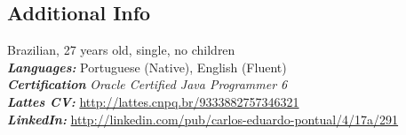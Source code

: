 \documentclass[margin, 10pt]{res} %
\begin{document}
\begin{resume}
\section {Additional Info}
Brazilian, 27 years old, single, no children \\
{\sl\bf Languages:} Portuguese (Native), English (Fluent) \\
{\sl\bf Certification} {\sl Oracle Certified Java Programmer 6} \\
{\sl\bf Lattes CV:} \url{http://lattes.cnpq.br/9333882757346321} \\
{\sl\bf LinkedIn:} \url{http://linkedin.com/pub/carlos-eduardo-pontual/4/17a/291} \\



\end{resume}
\end{document}
